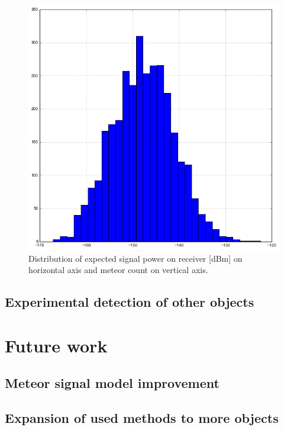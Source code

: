 \documentclass[twoside]{ctuthesis}
\theoremstyle{plain}
\theoremstyle{definition}
\theoremstyle{note}
\begin{document}
\begin{figure}
\includegraphics[width=\textwidth]{./img/Meteor_signal_intensity.png}
\caption{Distribution of expected signal power on receiver [dBm] on horizontal axis and meteor count on vertical axis.}
\label{VOR_meteors_intensity}
\end{figure}

\section{Experimental detection of other objects}



\chapter{Future work}

\section{Meteor signal model improvement}

\section{Expansion of used methods to more objects}


\appendix

\printindex

\appendix



\end{document}
